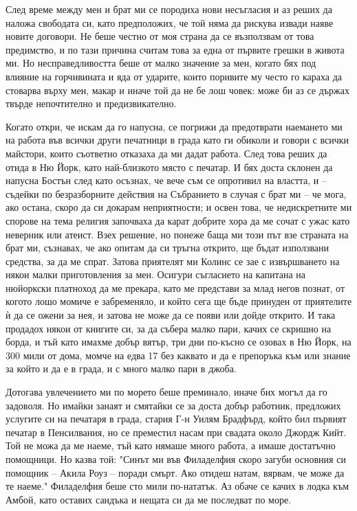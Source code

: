 \documentclass[12pt]{book}
\begin{document}
След време между мен и брат ми се породиха нови несъгласия и аз реших да наложа свободата си, като предположих, че той няма да рискува извади наяве новите договори. Не беше честно от моя страна да се възползвам от това предимство, и по тази причина считам това за една от първите грешки в живота ми. Но несправедливостта беше от малко значение за мен, когато бях под влияние на горчивината и яда от ударите, които поривите му често го караха да стоварва върху мен, макар и иначе той да не бе лош човек: може би аз се държах твърде непочтително и предизвикателно.

Когато откри, че искам да го напусна, се погрижи да предотврати наемането ми на работа във всички други печатници в града като ги обиколи и говори с всички майстори, които съответно отказаха да ми дадат работа. След това реших да отида в Ню Йорк, като най-близкото място с печатар. И бях доста склонен да напусна Бостън след като осъзнах, че вече съм се опротивил на властта, и – съдейки по безразборните действия на Събранието в случая с брат ми – че мога, ако остана, скоро да си докарам неприятности; и освен това, че недискретните ми спорове на тема религия започваха да карат добрите хора да ме сочат с ужас като неверник или атеист. Взех решение, но понеже баща ми този път взе страната на брат ми, съзнавах, че ако опитам да си тръгна открито, ще бъдат използвани средства, за да ме спрат. Затова приятелят ми Колинс се зае с извършването на някои малки приготовления за мен. Осигури съгласието на капитана на нюйоркски платноход да ме прекара, като ме представи за млад негов познат, от когото лошо момиче е забременяло, и който сега ще бъде принуден от приятелите ѝ да се ожени за нея, и затова не може да се появи или дойде открито. И така продадох някои от книгите си, за да събера малко пари, качих се скришно на борда, и тъй като имахме добър вятър, три дни по-късно се озовах в Ню Йорк, на 300 мили от дома, момче на едва 17 без каквато и да е препоръка към или знание за който и да е в града, и с много малко пари в джоба. 

Дотогава увлечението ми по морето беше преминало, иначе бих могъл да го задоволя. Но имайки занаят и смятайки се за доста добър работник, предложих услугите си на печатаря в града, стария Г-н Уилям Брадфърд, който бил първият печатар в Пенсилвания, но се преместил насам при свадата около Джордж Кийт. Той не можа да ме наеме, тъй като нямаше много работа, а имаше достатъчно помощници. Но казва той: "Синът ми във Филаделфия скоро загуби основния си помощник – Акила Роуз – поради смърт. Ако отидеш натам, вярвам, че може да те наеме."
Филаделфия беше сто мили по-нататък. Аз обаче се качих в лодка към Амбой, като оставих сандъка и нещата си да ме последват по море.
\end{document}
